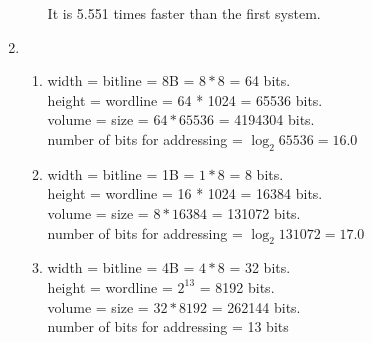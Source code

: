 \documentclass[12pt]{article}
\begin{document}
\begin{enumerate}
\begin{enumerate}
                It is 5.551 times faster than the first system.
        \end{enumerate}
    \item
        \begin{enumerate}
            \item
                width = bitline = 8B = $8*8$ = 64 bits.\\
                height = wordline = 64 * 1024 = 65536 bits.\\
                volume = size = $64*65536$ = 4194304 bits.\\
                number of bits for addressing = $\log_2{65536}=16.0$
            \item
                width = bitline = 1B = $1*8$ = 8 bits.\\
                height = wordline = 16 * 1024 = 16384 bits.\\
                volume = size = $8*16384$ = 131072 bits.\\
                number of bits for addressing = $\log_2{131072}=17.0$
            \item
                width = bitline = 4B = $4*8$ = 32 bits.\\
                height = wordline = $2^{13}$ = 8192 bits.\\
                volume = size = $32*8192$ = 262144 bits.\\
                number of bits for addressing = 13 bits\\

        \end{enumerate}

\end{enumerate}
\end{document}
